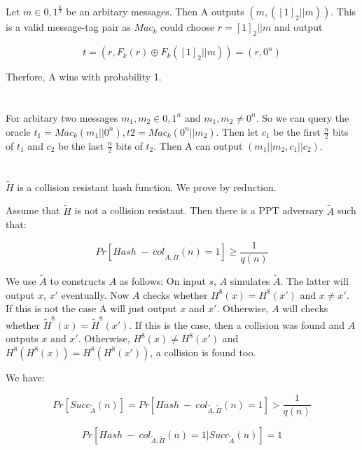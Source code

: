 \documentclass[onecolumn,oneside]{SUSTechHomework}
\begin{document}
    \subsection{}

    Let $m \in {0,1}^{\frac{n}{2}}$ be an arbitary messages. Then A outputs $(m,([1]_2||m))$.
    This is a valid message-tag pair as $Mac_k$ could choose $r=[1]_2||m$ and output

    $$t=(r,F_k(r) \oplus F_k([1]_2||m))=(r,0^n)$$

    Therfore, A wins with probability 1.

  \section{}

  For arbitary two messages $m_1, m_2 \in {0,1}^n$ and $m_1, m_2 \neq 0^n$.
  So we can query the oracle $t_1=Mac_k(m_1||0^n), t2=Mac_k(0^n||m_2)$. Then let $c_1$ be the first $\frac{n}{2}$ bits of $t_1$ and $c_2$ be the last $\frac{n}{2}$ bits of $t_2$.
  Then A can output $(m_1||m_2,c_1||c_2)$.

  \section{}

  $\widetilde{H}$ is a collision resistant hash function.
  We prove by reduction.

  Assume that $\widetilde{H}$ is not a collision resistant.
  Then there is a PPT adversary $\widetilde{A}$ such that:

  $$Pr[Hash~-~col_{\widetilde{A},\widetilde{\Pi}}(n)=1] \ge \frac{1}{q(n)}$$

  We use $\widetilde{A}$ to constructs $A$ as follows: On input $s$, $A$ simulates $\widetilde{A}$. The latter will output $x$, $x'$ eventually. Now $A$ checks whether $H^8(x)=H^8(x')$ and $x \neq x'$. If this is not the case A will just output $x$ and $x'$.
  Otherwise, $A$ will checks whether $\widetilde{H}^8(x)=\widetilde{H}^8(x')$.
  If this is the case, then a collision was found and $A$ outputs $x$ and $x'$.
  Otherwise, $H^8(x) \neq H^8(x')$ and $H^8(H^8(x))=H^8(H^8(x'))$, a collision is found too.

  We have:

  $$Pr[Succ_{\widetilde{A}}(n)]=Pr[Hash~-~col_{\widetilde{A},\widetilde{\Pi}}(n)=1]>\frac{1}{q(n)}$$

  $$Pr[Hash~-~col_{\widetilde{A},\widetilde{\Pi}}(n)=1|Succ_{\widetilde{A}}(n)]=1$$
\end{document}
